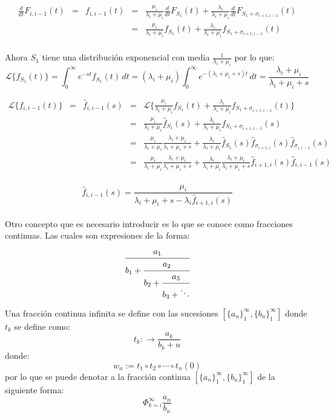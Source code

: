 \documentclass[11pt]{article}
\numberwithin{equation}{section} %
\begin{document}
\[
\begin{array}{rcrcl}
\frac{d}{dt} F_{i,i-1}(t) & = & f_{i,i-1}(t) & = & \frac{\mu_{i}}{\lambda_{i}+\mu_{i}} \frac{d}{dt} F_{S_{1}}(t) + \frac{\lambda_{i}}{\lambda_{i}+\mu_{i}} \frac{d}{dt} F_{ S_{1} + \sigma_{i+1,i-1}}(t)\\
 & & & = & \frac{\mu_{i}}{\lambda_{i}+\mu_{i}} f_{S_{1}}(t) + \frac{\lambda_{i}}{\lambda_{i}+\mu_{i}} f_{ S_{1} + \sigma_{i+1,i-1}}(t)\\
\end{array}
\]

Ahora $S_1$ tiene una distribución exponencial con media $\frac{1}{\lambda_i+\mu_i}$ por lo que:
\[
\mathcal{L}\{f_{S_1}(t)\}=\int_{0}^{\infty} e^{-st} f_{S_1}(t)\,dt=(\lambda_i+\mu_i)\int_{0}^{\infty} e^{-(\lambda_i+\mu_i+s)t}\,dt=\frac{\lambda_i+\mu_i}{\lambda_i+\mu_i+s}
\]

\[
\begin{array}{rcrcl}
\mathcal{L} \{ f_{i,i-1}(t) \} & = & \hat{f}_{i,i-1}(s) & = & \mathcal{L} \{ \frac{\mu_{i}}{\lambda_{i}+\mu_{i}} f_{S_{1}}(t) + \frac{\lambda_{i}}{\lambda_{i}+\mu_{i}} f_{ S_{1} + \sigma_{i+1,i-1}}(t) \}\\
 & & & = & \frac{\mu_{i}}{\lambda_{i}+\mu_{i}} \hat{f}_{S_{1}}(s) + \frac{\lambda_{i}}{\lambda_{i}+\mu_{i}} f_{ S_{1} + \sigma_{i+1,i-1}}(s) \\
 & & & = & \frac{\mu_{i}}{\lambda_{i}+\mu_{i}} \frac{\lambda_{i}+\mu_{i}}{\lambda_{i}+\mu_{i}+s} + \frac{\lambda_{i}}{\lambda_{i}+\mu_{i}} \hat{f}_{S_{1}}(s) \hat{f}_{\sigma_{i+1,i}}(s) \hat{f}_{\sigma_{i,i-1}}(s) \\
 & & & = & \frac{\mu_{i}}{\lambda_{i}+\mu_{i}} \frac{\lambda_{i}+\mu_{i}}{\lambda_{i}+\mu_{i}+s} + \frac{\lambda_{i}}{\lambda_{i}+\mu_{i}} \frac{\lambda_{i}+\mu_{i}}{\lambda_{i}+\mu_{i}+s} \hat{f}_{i+1,i}(s) \hat{f}_{i,i-1}(s) \\
\end{array}
\]
 
\begin{equation} \label{eq:distgen}
\hat{f}_{i,i-1}(s) = \frac{\mu_{i}}{\lambda_{i}+\mu_{i}+s-\lambda_{i}\hat{f}_{i+1,i}(s)}
\end{equation}\\

Otro concepto que es necesario introducir es lo que se conoce como fracciones continuas. Las cuales son expresiones de la forma:
\[
\cfrac{a_1}{b_1 + 
\cfrac{a_2}{b_2 + 
\cfrac{a_3}{b_3+ \ddots}}}
\]

Una fracción continua infinita se define con las sucesiones $\left[\{a_n\}_1^{\infty},\{b_n\}_1^{\infty}\right]$ donde $t_k$ se define como:
\[
t_k:\rightarrow \frac{a_k}{b_k+u}
\]
donde:
\[
w_n:=t_1\circ t_2 \circ \cdots \circ t_n(0)
\]
por lo que se puede denotar a la fracción continua $\left[\{a_n\}_1^{\infty},\{b_n\}_1^{\infty}\right]$ de la siguiente forma:
\[
\Phi_{k=i}^{\infty}\frac{a_n}{b_n}
\]
\end{document}
